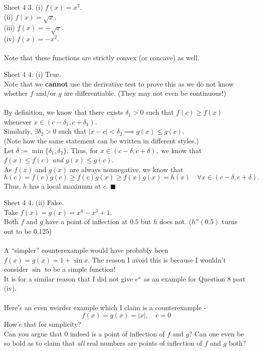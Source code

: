 \documentclass[handout, aspectratio=169]{beamer}
\begin{document}
\begin{frame}{Sheet 4}
	3. (i) $f(x) = x^2.$ \\
	 (ii) $f(x) = \sqrt{x}.$ \\
	 (iii) $f(x) = -\sqrt{x}.$ \\
	 (iv) $f(x) = -x^2.$ \\~\\
	 Note that these functions are strictly convex (or concave) as well.

\end{frame}
\begin{frame}{Sheet 4}
	4. (i) True.\\
	Note that we \textbf{cannot} use the derivative test to prove this as we do not know whether $f$ and/or $g$ are differentiable. (They may not even be continuous!)\\~\\
	By definition, we know that there exists $\delta_1 > 0$ such that $f(c) \ge f(x)$ whenever $x \in (c - \delta_1, c + \delta_1).$\\
	Similarly, $\exists \delta_2 > 0$ such that $|x - c| < \delta_2 \implies g(x) \le g(c).$\\
	(Note how the same statement can be written in different styles.)\\
	Let $\delta := \min\{\delta_1, \delta_2\}.$ Thus, for $x \in (c-\delta, c+\delta),$ we know that $f(x) \le f(c)$ \emph{and} $g(x) \le g(c).$\\
	As $f(x)$ and $g(x)$ are always nonnegative, we know that
	\[h(c) = f(c)g(c) \ge f(c)g(x) \ge f(x)g(x) = h(x) \quad \forall x \in (c-\delta, c+\delta).\]
	Thus, $h$ has a local maximum at $c.$ \hfill $\blacksquare$
\end{frame}
\begin{frame}{Sheet 4}
	4. (ii) False.\\
	Take $f(x) = g(x) = x^4 - x^3 + 1.$\\
	Both $f$ and $g$ have a point of inflection at $0.5$ but $h$ does not. ($h''(0.5)$ turns out to be $0.125$)\\~\\
	A ``simpler'' counterexample would have probably been $f(x) = g(x) = 1 + \sin x.$ The reason I avoid this is because I wouldn't consider $\sin$ to be a simple function!\\
	It is for a similar reason that I did not give $e^x$ as an example for Question 8 part (iv).\\~\\
	Here's an even weirder example which I claim is a counterexample -
	\[f(x) = g(x) = |x|, \quad c = 0\]
	How's that for simplicity?\\
	Can you argue that $0$ indeed is a point of inflection of $f$ and $g?$ Can one even be so bold as to claim that \emph{all} real numbers are points of inflection of $f$ and $g$ both?
\end{frame}
\end{document}
